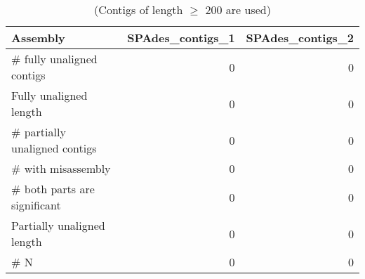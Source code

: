 \begin{table}[ht]
\begin{center}
\caption{(Contigs of length $\geq$ 200 are used)}
\begin{tabular}{|l*{2}{|r}|}
\hline
Assembly & SPAdes\_contigs\_1 & SPAdes\_contigs\_2 \\ \hline
\# fully unaligned contigs & 0 & 0 \\ \hline
Fully unaligned length & 0 & 0 \\ \hline
\# partially unaligned contigs & 0 & 0 \\ \hline
    \# with misassembly & 0 & 0 \\ \hline
    \# both parts are significant & 0 & 0 \\ \hline
Partially unaligned length & 0 & 0 \\ \hline
\# N & 0 & 0 \\ \hline
\end{tabular}
\end{center}
\end{table}
